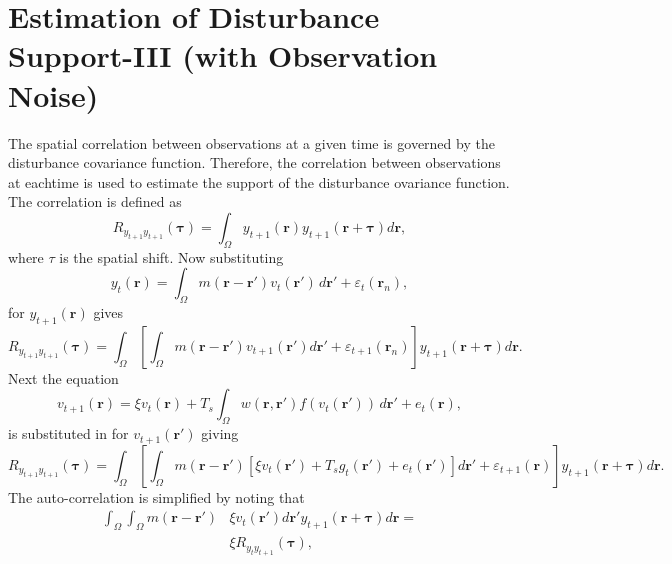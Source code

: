 \documentclass[]{article}
\begin{document}
\section*{Estimation of Disturbance Support-III (with Observation Noise)}
The spatial correlation between observations at a given time is governed by the disturbance covariance function. Therefore, the correlation between observations at eachtime is used to estimate the support of the disturbance ovariance function. The correlation is defined as
\begin{equation}
	R_{y_{t+1}y_{t+1}}(\boldsymbol{\tau}) = \int_{\Omega} y_{t+1}(\mathbf{r}) y_{t+1}(\mathbf{r}+\boldsymbol{\tau}) d\mathbf{r},
\end{equation}
where $\tau$ is the spatial shift. Now substituting 
\begin{equation}\label{eq:ObservationEquationNoisy}
	y_t(\mathbf{r}) = \int_{\Omega} { m\left(\mathbf{r}-\mathbf{r}'\right) v_t\left(\mathbf{r}'\right) \, d\mathbf{r}'} + \varepsilon_t(\mathbf{r}_n), 
\end{equation}
for  $y_{t+1}(\mathbf{r})$ gives 
\begin{equation}
	R_{y_{t+1}y_{t+1}}(\boldsymbol{\tau}) = \int_{\Omega}\left[ \int_{\Omega} m(\mathbf{r}-\mathbf{r}')v_{t+1}(\mathbf{r}')d\mathbf{r}' +\varepsilon_{t+1}(\mathbf{r}_n)\right] y_{t+1}(\mathbf{r}+\boldsymbol{\tau}) d\mathbf{r}.
\end{equation}
Next the equation
\begin{equation}
	\label{eq:DiscreteTimeModelNoisy} 
	v_{t+1}\left(\mathbf{r}\right) = 
	\xi v_t\left(\mathbf{r}\right) + 
	T_s \int_\Omega { 
	    w\left(\mathbf{r},\mathbf{r}'\right)
	    f\left(v_t\left(\mathbf{r}'\right)\right) 
	\, d\mathbf{r}'} 
	+ e_t\left(\mathbf{r}\right), 
\end{equation}
is substituted in for  $v_{t+1}(\mathbf{r}')$ giving 
\begin{equation}
	R_{y_{t+1}y_{t+1}}(\boldsymbol{\tau}) = \int_{\Omega}\left[ \int_{\Omega} m(\mathbf{r}-\mathbf{r}')\left[ \xi v_t\left(\mathbf{r}'\right) + 
	T_s g_t(\mathbf{r}') 
	+ e_t\left(\mathbf{r}'\right)\right] d\mathbf{r}' +\varepsilon_{t+1}(\mathbf{r})\right] y_{t+1}(\mathbf{r}+\boldsymbol{\tau}) d\mathbf{r}.
\end{equation}
The auto-correlation is simplified by noting that
\begin{align}
	\int_{\Omega}\int_{\Omega} m(\mathbf{r}-\mathbf{r}')&\xi v_t(\mathbf{r}')d\mathbf{r}'y_{t+1}(\mathbf{r}+\boldsymbol{\tau}) d\mathbf{r} = \nonumber \\ 
 &\xi R_{y_ty_{t+1}}(\boldsymbol{\tau}),
\end{align}
\end{document}
